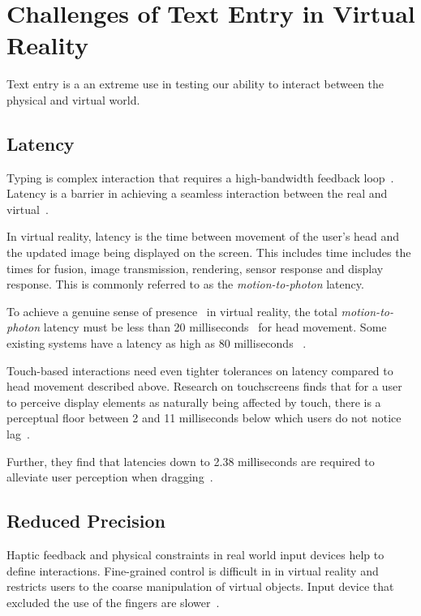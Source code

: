 \section{Challenges of Text Entry in Virtual Reality}
Text entry is a  an extreme use in testing our ability to interact between the physical and virtual world.

\subsection{Latency}
Typing is complex interaction that requires a high-bandwidth feedback loop~\cite{McGill:2015:DRO:2702123.2702382}.
Latency is a barrier in achieving a seamless interaction between the real and virtual~\cite{leedesigning}.

In virtual reality, latency is the time between movement of the user's head and the updated image being displayed on the screen.  
This includes time includes the times for fusion, image transmission,
rendering, sensor response and display response.
This is commonly referred to as the \textit{motion-to-photon} latency.

To achieve a genuine sense of presence~\cite{schuemie2001research} in virtual reality, the total \textit{motion-to-photon} latency must be less than 20 milliseconds~\cite{jerald2009relating,jerald2010scene,bailey2004latency} for head movement.
Some existing systems have a latency as high as 80 milliseconds ~\cite{lincoln2016motion,dallaire2016animated}.

Touch-based interactions need even tighter tolerances on latency compared to head movement described above.
Research on touchscreens finds that for a user to perceive display elements as naturally being affected by touch, there is a perceptual floor between 2  and 11 milliseconds below which users do not notice lag~\cite{Jota:2013:FFE:2470654.2481317,Ng:2012:DLD:2380116.2380174}.

Further, they find that latencies down to 2.38 milliseconds are required to alleviate user perception when dragging~\cite{Jota:2013:FFE:2470654.2481317,Ng:2012:DLD:2380116.2380174}.

\subsection{Reduced Precision}
Haptic feedback and physical constraints in real world input devices help to define interactions. 
Fine-grained control is difficult in in virtual reality and restricts users to the coarse manipulation of virtual objects.
Input device that excluded the use of the fingers are slower~\cite{Zhai:1996:IMG:238386.238534}.

